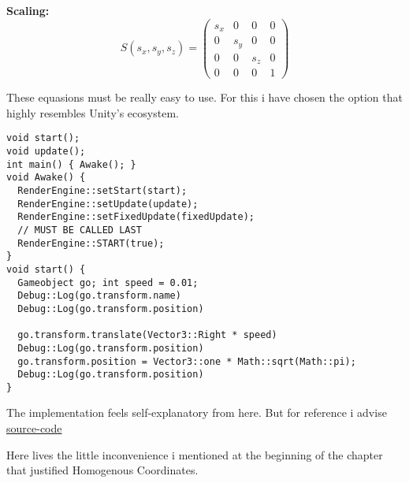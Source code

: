 \textbf{Scaling:}
\begin{equation}
    S(s_x, s_y, s_z) = \begin{pmatrix}
    s_x & 0 & 0 & 0 \\
    0 & s_y & 0 & 0 \\
    0 & 0 & s_z & 0 \\
    0 & 0 & 0 & 1
    \end{pmatrix}
\end{equation}



These equasions must be really easy to use. 
For this i have chosen the option that highly resembles Unity's ecosystem.


\begin{lstlisting}
void start();
void update();
int main() { Awake(); }
void Awake() {
  RenderEngine::setStart(start);
  RenderEngine::setUpdate(update);
  RenderEngine::setFixedUpdate(fixedUpdate);
  // MUST BE CALLED LAST
  RenderEngine::START(true);
}
void start() {
  Gameobject go; int speed = 0.01;
  Debug::Log(go.transform.name)
  Debug::Log(go.transform.position)
  
  go.transform.translate(Vector3::Right * speed)
  Debug::Log(go.transform.position)
  go.transform.position = Vector3::one * Math::sqrt(Math::pi);
  Debug::Log(go.transform.position)
}
\end{lstlisting}

The implementation feels self-explanatory from here. But for reference i advise 
\href{https://www.github.com}{source-code}





\pagebreak


Here lives the little inconvenience i mentioned at the beginning of the chapter 
that justified Homogenous Coordinates.

